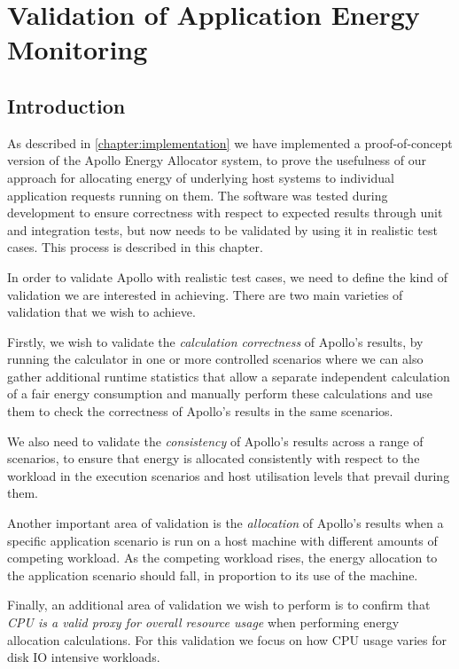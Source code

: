 \chapter{Validation of Application Energy Monitoring}
\label{chapter:validation}

\section{Introduction}

As described in \cref{chapter:implementation} we have implemented a proof-of-concept version of the Apollo Energy Allocator system, to prove the usefulness of our approach for allocating energy of underlying host systems to individual application requests running on them.  The software was tested during development to ensure correctness with respect to expected results through unit and integration tests, but now needs to be validated by using it in realistic test cases.  This process is described in this chapter.

In order to validate Apollo with realistic test cases, we need to define the kind of validation we are interested in achieving.  There are two main varieties of validation that we wish to achieve.

Firstly, we wish to validate the \emph{calculation correctness} of Apollo's results, by running the calculator in one or more controlled scenarios where we can also gather additional runtime statistics that allow a separate independent calculation of a fair energy consumption and manually perform these calculations and use them to check the correctness of Apollo's results in the same scenarios.

We also need to validate the \emph{consistency} of Apollo's results across a range of scenarios, to ensure that energy is allocated consistently with respect to the workload in the execution scenarios and host utilisation levels that prevail during them.

Another important area of validation is the \emph{allocation} of Apollo's results when a specific application scenario is run on a host machine with different amounts of competing workload.  As the competing workload rises, the energy allocation to the application scenario should fall, in proportion to its use of the machine.

Finally, an additional area of validation we wish to perform is to confirm that \emph{CPU is a valid proxy for overall resource usage} when performing energy allocation calculations.  For this validation we focus on how CPU usage varies for disk IO intensive workloads.

